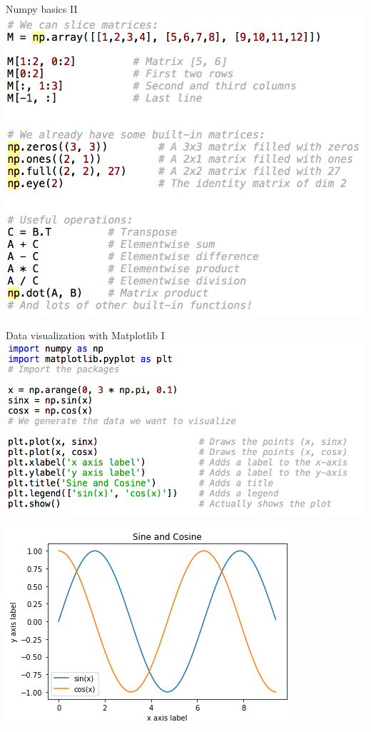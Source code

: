 \documentclass[11pt,unknownkeysallowed,usenames,dvipsnames]{beamer}
\begin{document}
\begin{frame}{Numpy basics II}
	\includegraphics[width=0.8\linewidth]{code-numpy2}
\end{frame}

\begin{frame}{Data visualization with Matplotlib I}
    \includegraphics[width=0.8\linewidth]{code-matplotlib1}
    
	\centering    \includegraphics[width=0.4\linewidth]{plot1}
\end{frame}
\end{document}
